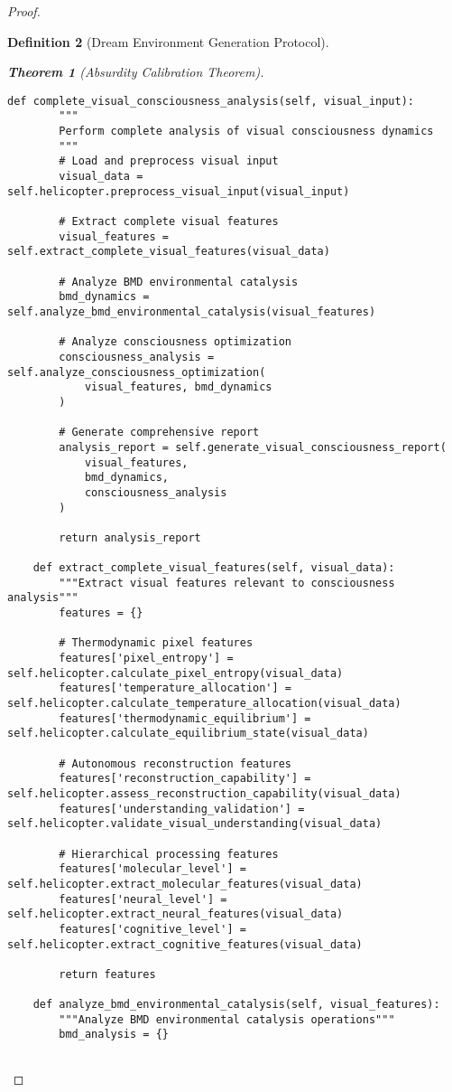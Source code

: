 \documentclass[12pt,a4paper]{article}
\newtheorem{theorem}{Theorem}[section]
\newtheorem{definition}[theorem]{Definition}
\begin{document}
\begin{proof}
\begin{definition}[Dream Environment Generation Protocol]
\begin{theorem}[Absurdity Calibration Theorem]
\begin{lstlisting}[style=pythonstyle, caption=Complete Visual Consciousness Analysis]
    def complete_visual_consciousness_analysis(self, visual_input):
        """
        Perform complete analysis of visual consciousness dynamics
        """
        # Load and preprocess visual input
        visual_data = self.helicopter.preprocess_visual_input(visual_input)
        
        # Extract complete visual features
        visual_features = self.extract_complete_visual_features(visual_data)
        
        # Analyze BMD environmental catalysis
        bmd_dynamics = self.analyze_bmd_environmental_catalysis(visual_features)
        
        # Analyze consciousness optimization
        consciousness_analysis = self.analyze_consciousness_optimization(
            visual_features, bmd_dynamics
        )
        
        # Generate comprehensive report
        analysis_report = self.generate_visual_consciousness_report(
            visual_features,
            bmd_dynamics,
            consciousness_analysis
        )
        
        return analysis_report
    
    def extract_complete_visual_features(self, visual_data):
        """Extract visual features relevant to consciousness analysis"""
        features = {}
        
        # Thermodynamic pixel features
        features['pixel_entropy'] = self.helicopter.calculate_pixel_entropy(visual_data)
        features['temperature_allocation'] = self.helicopter.calculate_temperature_allocation(visual_data)
        features['thermodynamic_equilibrium'] = self.helicopter.calculate_equilibrium_state(visual_data)
        
        # Autonomous reconstruction features
        features['reconstruction_capability'] = self.helicopter.assess_reconstruction_capability(visual_data)
        features['understanding_validation'] = self.helicopter.validate_visual_understanding(visual_data)
        
        # Hierarchical processing features
        features['molecular_level'] = self.helicopter.extract_molecular_features(visual_data)
        features['neural_level'] = self.helicopter.extract_neural_features(visual_data)
        features['cognitive_level'] = self.helicopter.extract_cognitive_features(visual_data)
        
        return features
    
    def analyze_bmd_environmental_catalysis(self, visual_features):
        """Analyze BMD environmental catalysis operations"""
        bmd_analysis = {}
        

\end{lstlisting}
\end{theorem}
\end{definition}
\end{proof}
\end{document}
